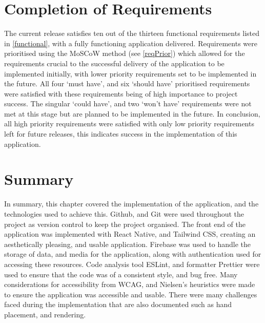 \section{Completion of Requirements}
The current release satisfies ten out of the thirteen functional requirements listed in \ref{functional}, with a fully functioning application delivered. Requirements were prioritised using the MoSCoW method (see \ref{reqPrior}) which allowed for the requirements crucial to the successful delivery of the application to be implemented initially, with lower priority requirements set to be implemented in the future. All four `must have', and six `should have' prioritised requirements were satisfied with these requirements being of high importance to project success. The singular `could have', and two `won't have' requirements were not met at this stage but are planned to be implemented in the future. In conclusion, all high priority requirements were satisfied with only low priority requirements left for future releases, this indicates success in the implementation of this application.


\section{Summary}

In summary, this chapter covered the implementation of the application, and the technologies used to achieve this. Github, and Git were used throughout the project as version control to keep the project organised. The front end of the application was implemented with React Native, and Tailwind CSS, creating an aesthetically pleasing, and usable application. Firebase was used to handle the storage of data, and media for the application, along with authentication used for accessing these resources. Code analysis tool ESLint, and formatter Prettier were used to ensure that the code was of a consistent style, and bug free. Many considerations for accessibility from WCAG, and Nielsen's heuristics were made to ensure the application was accessible and usable. There were many challenges faced during the implementation that are also documented such as hand placement, and rendering.